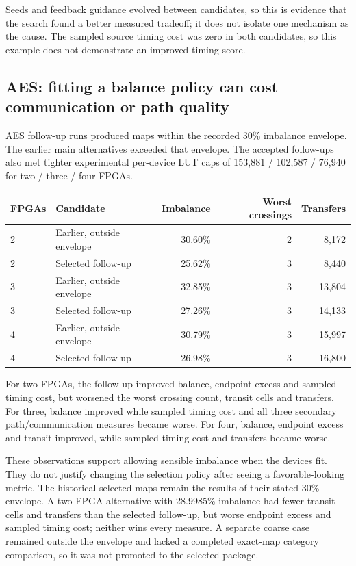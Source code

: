 \documentclass[11pt]{article}
\begin{document}
Seeds and feedback guidance evolved between candidates, so this is evidence that the search found a better measured tradeoff; it does not isolate one mechanism as the cause. The sampled source timing cost was zero in both candidates, so this example does not demonstrate an improved timing score.

\subsection{AES: fitting a balance policy can cost communication or path quality}

AES follow-up runs produced maps within the recorded 30\% imbalance envelope. The earlier main alternatives exceeded that envelope. The accepted follow-ups also met tighter experimental per-device LUT caps of 153,881 / 102,587 / 76,940 for two / three / four FPGAs.

\begin{center}\small
\begin{tabular}{llrrr}
\toprule
FPGAs & Candidate & Imbalance & Worst crossings & Transfers\\
\midrule
2 & Earlier, outside envelope & 30.60\% & 2 & 8,172\\
2 & Selected follow-up & 25.62\% & 3 & 8,440\\
3 & Earlier, outside envelope & 32.85\% & 3 & 13,804\\
3 & Selected follow-up & 27.26\% & 3 & 14,133\\
4 & Earlier, outside envelope & 30.79\% & 3 & 15,997\\
4 & Selected follow-up & 26.98\% & 3 & 16,800\\
\bottomrule
\end{tabular}
\end{center}
For two FPGAs, the follow-up improved balance, endpoint excess and sampled timing cost, but worsened the worst crossing count, transit cells and transfers. For three, balance improved while sampled timing cost and all three secondary path/communication measures became worse. For four, balance, endpoint excess and transit improved, while sampled timing cost and transfers became worse.

These observations support allowing sensible imbalance when the devices fit. They do not justify changing the selection policy after seeing a favorable-looking metric. The historical selected maps remain the results of their stated 30\% envelope. A two-FPGA alternative with 28.9985\% imbalance had fewer transit cells and transfers than the selected follow-up, but worse endpoint excess and sampled timing cost; neither wins every measure. A separate coarse case remained outside the envelope and lacked a completed exact-map category comparison, so it was not promoted to the selected package.
\end{document}
